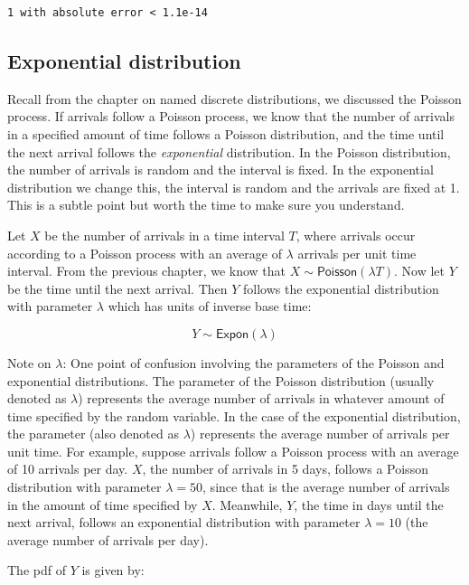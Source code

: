 \documentclass[
  letterpaper,
  DIV=11,
  numbers=noendperiod]{scrreprt}
\begin{document}
\begin{verbatim}
1 with absolute error < 1.1e-14
\end{verbatim}

\subsection{Exponential distribution}\label{exponential-distribution}

Recall from the chapter on named discrete distributions, we discussed
the Poisson process. If arrivals follow a Poisson process, we know that
the number of arrivals in a specified amount of time follows a Poisson
distribution, and the time until the next arrival follows the
\emph{exponential} distribution. In the Poisson distribution, the number
of arrivals is random and the interval is fixed. In the exponential
distribution we change this, the interval is random and the arrivals are
fixed at 1. This is a subtle point but worth the time to make sure you
understand.

Let \(X\) be the number of arrivals in a time interval \(T\), where
arrivals occur according to a Poisson process with an average of
\(\lambda\) arrivals per unit time interval. From the previous chapter,
we know that \(X\sim \textsf{Poisson}(\lambda T)\). Now let \(Y\) be the
time until the next arrival. Then \(Y\) follows the exponential
distribution with parameter \(\lambda\) which has units of inverse base
time:

\[
Y \sim \textsf{Expon}(\lambda)
\]

Note on \(\lambda\): One point of confusion involving the parameters of
the Poisson and exponential distributions. The parameter of the Poisson
distribution (usually denoted as \(\lambda\)) represents the average
number of arrivals in whatever amount of time specified by the random
variable. In the case of the exponential distribution, the parameter
(also denoted as \(\lambda\)) represents the average number of arrivals
per unit time. For example, suppose arrivals follow a Poisson process
with an average of 10 arrivals per day. \(X\), the number of arrivals in
5 days, follows a Poisson distribution with parameter \(\lambda=50\),
since that is the average number of arrivals in the amount of time
specified by \(X\). Meanwhile, \(Y\), the time in days until the next
arrival, follows an exponential distribution with parameter
\(\lambda=10\) (the average number of arrivals per day).

The pdf of \(Y\) is given by:
\end{document}
